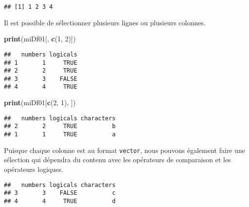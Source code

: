 \documentclass[]{book}
\newenvironment{Shaded}{\begin{snugshade}}{\end{snugshade}}
\newcommand{\KeywordTok}[1]{\textcolor[rgb]{0.13,0.29,0.53}{\textbf{#1}}}
\newcommand{\DecValTok}[1]{\textcolor[rgb]{0.00,0.00,0.81}{#1}}
\newcommand{\StringTok}[1]{\textcolor[rgb]{0.31,0.60,0.02}{#1}}
\newcommand{\OtherTok}[1]{\textcolor[rgb]{0.56,0.35,0.01}{#1}}
\newcommand{\OperatorTok}[1]{\textcolor[rgb]{0.81,0.36,0.00}{\textbf{#1}}}
\newcommand{\NormalTok}[1]{#1}
\theoremstyle{definition}
\theoremstyle{definition}
\theoremstyle{definition}
\theoremstyle{remark}
\begin{document}
\begin{verbatim}
## [1] 1 2 3 4
\end{verbatim}

Il est possible de sélectionner plusieurs lignes ou plusieurs colonnes.

\begin{Shaded}
\begin{Highlighting}[]
\KeywordTok{print}\NormalTok{(miDf01[, }\KeywordTok{c}\NormalTok{(}\DecValTok{1}\NormalTok{, }\DecValTok{2}\NormalTok{)])}
\end{Highlighting}
\end{Shaded}

\begin{verbatim}
##   numbers logicals
## 1       1     TRUE
## 2       2     TRUE
## 3       3    FALSE
## 4       4     TRUE
\end{verbatim}

\begin{Shaded}
\begin{Highlighting}[]
\KeywordTok{print}\NormalTok{(miDf01[}\KeywordTok{c}\NormalTok{(}\DecValTok{2}\NormalTok{, }\DecValTok{1}\NormalTok{), ])}
\end{Highlighting}
\end{Shaded}

\begin{verbatim}
##   numbers logicals characters
## 2       2     TRUE          b
## 1       1     TRUE          a
\end{verbatim}

Puisque chaque colonne est au format \texttt{vector}, nous pouvons
également faire une sélection qui dépendra du contenu avec les
opérateurs de comparaison et les opérateurs logiques.

\begin{Shaded}
\end{Shaded}

\begin{verbatim}
##   numbers logicals characters
## 3       3    FALSE          c
## 4       4     TRUE          d
\end{verbatim}

\begin{Shaded}
\end{Shaded}
\end{document}
